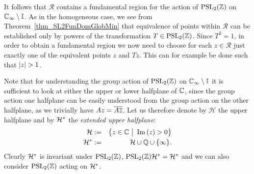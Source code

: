 It follows that $\mathcal{R}$ contains a fundamental region for the action of $\operatorname{PSL}_{2}(\mathbb{Z})$ on $\mathbb{C}_{\infty} \setminus \mathbb{I}$. As in the homogeneous case, we see from Theorem~\ref{thm_SL2FunDomGlobMin} that equivalence of points within $\mathcal{R}$ can be established only by powers of the transformation $T \in \operatorname{PSL}_{2}(\mathbb{Z})$. Since $T^2 = 1$, in order to obtain a fundamental region we now need to choose for each $z \in \mathcal{R}$ just exactly one of the equivalent points $z$ and $Tz$. This can for example be done such that $\left|z\right| > 1$.

Note that for understanding the group action of $\operatorname{PSL}_{2}(\mathbb{Z})$ on $\mathbb{C}_{\infty} \setminus \mathbb{I}$ it is sufficient to look at either the upper or lower halfplane of $\mathbb{C}$, since the group action one halfplane can be easily understood from the group action on the other halfplane, as we trivially have $Az = \overline{A\overline{z}}$. Let us therefore denote by $\mathcal{H}$ the upper halfplane and by $\mathcal{H}^\ast$ the \emph{extended upper halfplane}:
\begin{eqnarray}
\label{eqn_UpperHalfplane}\mathcal{H} &:=& \big\{ z \in \mathbb{C} \ \big| \ \operatorname{Im}\left(z\right) > 0 \big\} \\
\label{eqn_ExtUpperHalfplane}
\mathcal{H}^\ast &:=& \mathcal{H} \cup \mathbb{Q} \cup \{\infty\}.
\end{eqnarray}
Clearly $\mathcal{H}^\ast$ is invariant under $\operatorname{PSL}_{2}(\mathbb{Z})$, \ie $\operatorname{PSL}_{2}(\mathbb{Z}) \mathcal{H}^\ast = \mathcal{H}^\ast$ and we can also consider $\operatorname{PSL}_{2}(\mathbb{Z})$ acting on $\mathcal{H}^\ast$.

